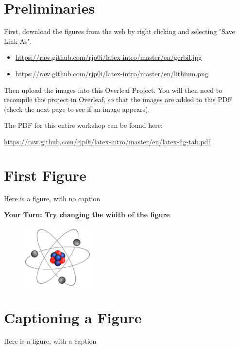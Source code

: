 \documentclass{article}
\begin{document}
\section{Preliminaries}
\large
First, download the figures from the web by right clicking and selecting "Save Link As".
\bigskip
\begin{itemize}
\item \url{https://raw.github.com/rjp0i/latex-intro/master/en/gerbil.jpg}

\item \url{https://raw.github.com/rjp0i/latex-intro/master/en/lithium.png}

\end{itemize}


\medskip

Then upload the images into this Overleaf Project. You will then need to recompile this project in Overleaf, so that the images are added to this PDF (check the next page to see if an image appears).
\bigskip

\bigskip


The PDF for this entire workshop can be found here:


\item \url{https://raw.github.com/rjp0i/latex-intro/master/en/latex-fig-tab.pdf}



\clearpage
\section{First Figure}

Here is a figure, with no caption
\medskip

{\bf Your Turn: Try changing the width of the figure}

\begin{figure}
\centering   %
\includegraphics[width=1.5in]{lithium.png} %
\end{figure}
\clearpage
\section{Captioning a Figure}
Here is a figure, with a caption
\end{document}
